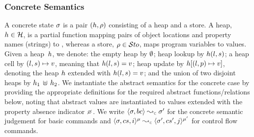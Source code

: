 \subsubsection{Concrete Semantics}
A \jsil concrete state $\sigma$ is a pair $(h, \rho)$ consisting of a heap and a store. 
A heap, $h \in {\mathcal H}$, is a partial function mapping pairs of  object locations and property names (strings) to ,
whereas a store, $\rho \in \mathcal{S}to$, maps \jsil program variables to \jsil values. 
Given a heap~$h$, we denote: the empty heap by $\emptyset$; heap lookup by $h(l, s)$; 
a heap cell by $(l, s) \mapsto v$, meaning that  $h(l,s) = v$; 
heap update by $h[(l, p) \mapsto v]$, denoting the heap $h$ extended with $h(l,s) = v$;
and the union of two disjoint heaps by $h_1 \, \uplus \, h_2$.
We instantiate the abstract semantics for the concrete case by providing the appropriate definitions 
for the required abstract functions/relations below, noting that abstract values are instantiated to
\jsil values extended with the property absence indicator $\none$.
We write $\absbsemrule{\jstate, \bcmd}{\jstate'}{\concrete}$ for the concrete semantic 
judgement for basic commands and $\abssemrule{\jstate, \cs, i}{\jstate', \cs', j}{\mode}{\mode'}{\concrete}$ 
for control flow commands. 

